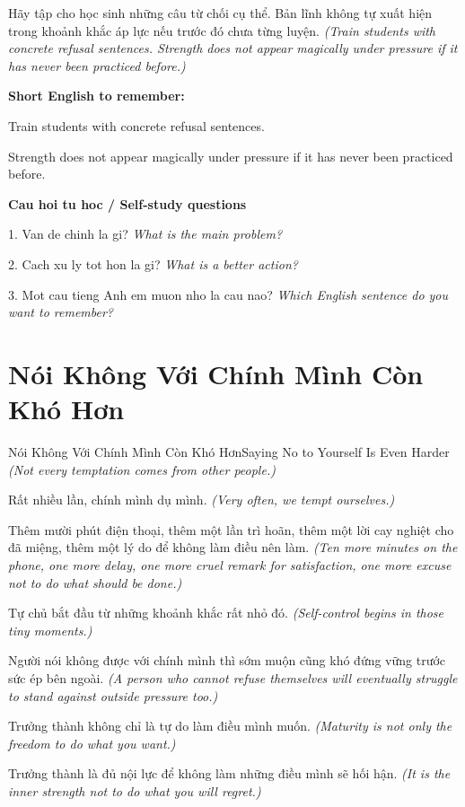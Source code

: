 \begin{baihoc}
Hãy tập cho học sinh những câu từ chối cụ thể. Bản lĩnh không tự xuất hiện trong khoảnh khắc áp lực nếu trước đó chưa từng luyện.
\textit{(Train students with concrete refusal sentences. Strength does not appear magically under pressure if it has never been practiced before.)}
\end{baihoc}

\begin{ghinhoanh}
\textbf{Short English to remember:}

Train students with concrete refusal sentences.

Strength does not appear magically under pressure if it has never been practiced before.

\end{ghinhoanh}

\begin{tuhocnhanh}
\textbf{Cau hoi tu hoc / Self-study questions}

1. Van de chinh la gi? \textit{What is the main problem?}

2. Cach xu ly tot hon la gi? \textit{What is a better action?}

3. Mot cau tieng Anh em muon nho la cau nao? \textit{Which English sentence do you want to remember?}
\end{tuhocnhanh}
\ngancach

\section{Nói Không Với Chính Mình Còn Khó Hơn}
\begin{truyen}{Nói Không Với Chính Mình Còn Khó Hơn}{Saying No to Yourself Is Even Harder}
\textit{(Not every temptation comes from other people.)}

Rất nhiều lần, chính mình dụ mình.
\textit{(Very often, we tempt ourselves.)}

Thêm mười phút điện thoại, thêm một lần trì hoãn, thêm một lời cay nghiệt cho đã miệng, thêm một lý do để không làm điều nên làm.
\textit{(Ten more minutes on the phone, one more delay, one more cruel remark for satisfaction, one more excuse not to do what should be done.)}

Tự chủ bắt đầu từ những khoảnh khắc rất nhỏ đó.
\textit{(Self-control begins in those tiny moments.)}

Người nói không được với chính mình thì sớm muộn cũng khó đứng vững trước sức ép bên ngoài.
\textit{(A person who cannot refuse themselves will eventually struggle to stand against outside pressure too.)}

Trưởng thành không chỉ là tự do làm điều mình muốn.
\textit{(Maturity is not only the freedom to do what you want.)}

Trưởng thành là đủ nội lực để không làm những điều mình sẽ hối hận.
\textit{(It is the inner strength not to do what you will regret.)}

\end{truyen}

